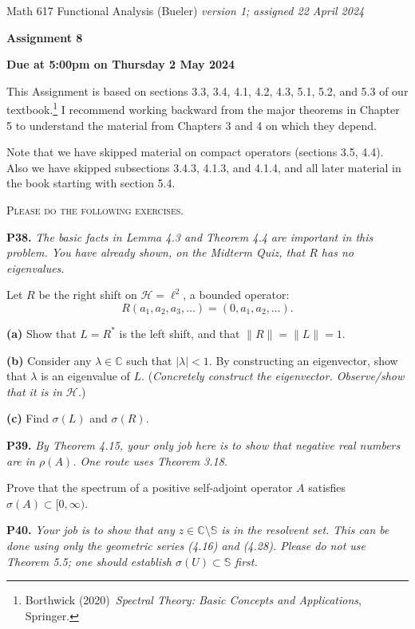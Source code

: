 \documentclass[12pt]{amsart}
\newcommand{\cH}{\mathcal{H}}
\newcommand{\CC}{\mathbb{C}}
\newcommand{\prob}[1]{\bigskip\noindent\textbf{#1.}\quad }
\newcommand{\epart}[1]{\medskip\noindent\textbf{(#1)}\quad }
\begin{document}
\scriptsize \noindent Math 617 Functional Analysis (Bueler) \hfill \emph{version 1; assigned 22 April 2024}
\normalsize\medskip

\Large\centerline{\textbf{Assignment 8}}
\large
\medskip

\centerline{\textbf{Due at 5:00pm on Thursday 2 May 2024}}
\medskip
\normalsize

\thispagestyle{empty}

\bigskip
\noindent This Assignment is based on sections 3.3, 3.4, 4.1, 4.2, 4.3, 5.1, 5.2, and 5.3 of our textbook.\footnote{Borthwick (2020)~\emph{Spectral Theory: Basic Concepts and Applications}, Springer.}  I recommend working backward from the major theorems in Chapter 5 to understand the material from Chapters 3 and 4 on which they depend.

\bigskip
\noindent Note that we have skipped material on compact operators (sections 3.5, 4.4).  Also we have skipped subsections 3.4.3, 4.1.3, and 4.1.4, and all later material in the book starting with section 5.4.

\medskip
\noindent \textsc{Please do the following exercises.}
\smallskip

\renewcommand{\SS}{\mathbb{S}}


\prob{P38}  \emph{The basic facts in Lemma 4.3 and Theorem 4.4 are important in this problem.  You have already shown, on the Midterm Quiz, that $R$ has no eigenvalues.}

\medskip\noindent Let $R$ be the right shift on $\cH=\ell^2$, a bounded operator:
	$$R (a_1,a_2,a_3,\dots) = (0,a_1,a_2,\dots).$$

\epart{a}  Show that $L=R^*$ is the left shift, and that $\|R\|=\|L\|=1$.

\epart{b}  Consider any $\lambda\in\CC$ such that $|\lambda|<1$.  By constructing an eigenvector, show that $\lambda$ is an eigenvalue of $L$.  (\emph{Concretely construct the eigenvector.  Observe/show that it is in $\cH$.})

\epart{c}  Find $\sigma(L)$ and $\sigma(R)$.


\prob{P39}  \emph{By Theorem 4.15, your only job here is to show that negative real numbers are in $\rho(A)$.  One route uses Theorem 3.18.}

\medskip\noindent Prove that the spectrum of a positive self-adjoint operator $A$ satisfies $\sigma(A) \subset [0,\infty)$.


\prob{P40}  \emph{Your job is to show that any $z\in\CC\setminus \SS$ is in the resolvent set.  This can be done using only the geometric series (4.16) and (4.28).  Please do not use Theorem 5.5; one should establish $\sigma(U) \subset \SS$ first.}
\end{document}
